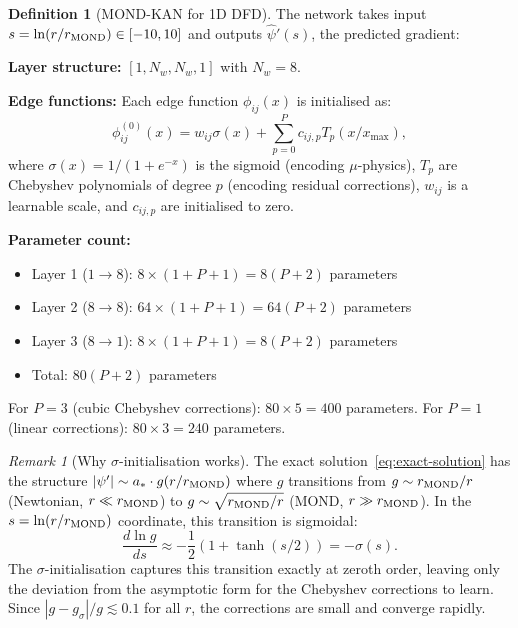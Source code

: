 \documentclass[11pt]{article}
\theoremstyle{definition}
\newtheorem{definition}[theorem]{Definition}
\theoremstyle{remark}
\newtheorem{remark}[theorem]{Remark}
\begin{document}
\begin{definition}[MOND-KAN for 1D DFD]
\label{def:mond-kan-arch}
The network takes input $s = \ln(r/r_{\rm MOND}) \in [-10, 10]$ and
outputs $\hat{\psi}'(s)$, the predicted gradient:

\textbf{Layer structure:} $[1, N_w, N_w, 1]$ with $N_w = 8$.

\textbf{Edge functions:} Each edge function $\phi_{ij}(x)$ is initialised as:
\begin{equation}
  \phi_{ij}^{(0)}(x) = w_{ij} \sigma(x) + \sum_{p=0}^{P} c_{ij,p} T_p(x/x_{\max}),
  \label{eq:edge-function}
\end{equation}
where $\sigma(x) = 1/(1+e^{-x})$ is the sigmoid (encoding $\mu$-physics),
$T_p$ are Chebyshev polynomials of degree $p$ (encoding residual corrections),
$w_{ij}$ is a learnable scale, and $c_{ij,p}$ are initialised to zero.

\textbf{Parameter count:}
\begin{itemize}[nosep]
\item Layer 1 ($1 \to 8$): $8 \times (1 + P + 1) = 8(P+2)$ parameters
\item Layer 2 ($8 \to 8$): $64 \times (1 + P + 1) = 64(P+2)$ parameters
\item Layer 3 ($8 \to 1$): $8 \times (1 + P + 1) = 8(P+2)$ parameters
\item Total: $80(P+2)$ parameters
\end{itemize}
For $P = 3$ (cubic Chebyshev corrections): $80 \times 5 = 400$ parameters.
For $P = 1$ (linear corrections): $80 \times 3 = 240$ parameters.
\end{definition}

\begin{remark}[Why $\sigma$-initialisation works]
\label{rem:sigma-init}
The exact solution~\eqref{eq:exact-solution} has the structure
$|\psi'| \sim a_* \cdot g(r/r_{\rm MOND})$ where $g$ transitions from
$g \sim r_{\rm MOND}/r$ (Newtonian, $r \ll r_{\rm MOND}$) to
$g \sim \sqrt{r_{\rm MOND}/r}$ (MOND, $r \gg r_{\rm MOND}$). In the
$s = \ln(r/r_{\rm MOND})$ coordinate, this transition is sigmoidal:
\begin{equation}
  \frac{d\ln g}{ds} \approx -\frac{1}{2}\left(1 + \tanh(s/2)\right)
  = -\sigma(s).
\end{equation}
The $\sigma$-initialisation captures this transition exactly at zeroth
order, leaving only the deviation from the asymptotic form for the
Chebyshev corrections to learn. Since $|g - g_{\sigma}|/g \lesssim 0.1$
for all $r$, the corrections are small and converge rapidly.
\end{remark}
\end{document}
